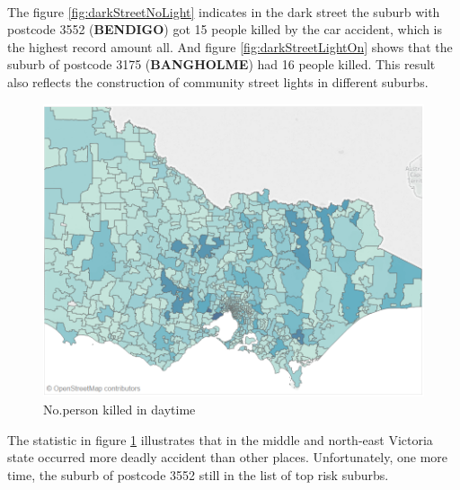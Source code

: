 \documentclass[10pt]{article}
\theoremstyle{definition}
\begin{document}
\vspace{12pt}\\
The figure \ref{fig:darkStreetNoLight} indicates in the dark street the suburb with postcode 3552 (\textbf{BENDIGO}) got 15 people killed by the car accident, which is the highest record amount all. And figure \ref{fig:darkStreetLightOn} shows that the suburb of postcode 3175 (\textbf{BANGHOLME}) had 16 people killed. This result also reflects the construction of community street lights in different suburbs. \par

\begin{figure}[H] %
	\centering
	\includegraphics[width=0.7\linewidth]{images/day.png}
	\caption{No.person killed in daytime}
	\label{fig:day}
\end{figure}
The statistic in figure \ref{fig:day} illustrates that in the middle and north-east Victoria state occurred more deadly accident than other places. Unfortunately, one more time, the suburb of postcode 3552 still in the list of top risk suburbs.\par
\end{document}
